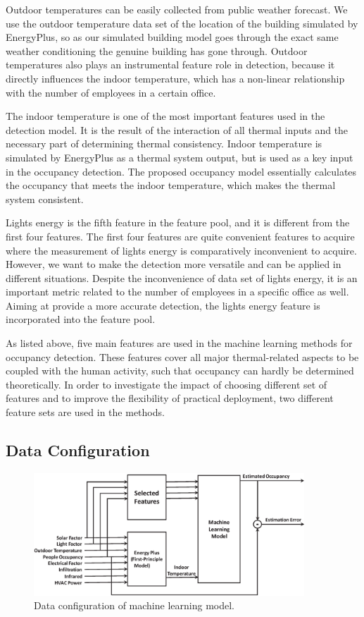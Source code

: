 Outdoor temperatures can be easily collected from public weather forecast. We
use the outdoor temperature data set of the location of the building simulated
by EnergyPlus, so as our simulated building model goes through the exact same
weather conditioning the genuine building has gone through. Outdoor
temperatures also plays an instrumental feature role in detection, because it
directly influences the indoor temperature, which has a non-linear relationship
with the number of employees in a certain office.

The indoor temperature is one of the most important features used in the
detection model. It is the result of the interaction of all thermal inputs and
the necessary part of determining thermal consistency. Indoor temperature is
simulated by EnergyPlus as a thermal system output, but is used as a key input
in the occupancy detection. The proposed occupancy model essentially calculates
the occupancy that meets the indoor temperature, which makes the thermal system
consistent.

Lights energy is the fifth feature in the feature pool, and it is
different from the first four features. The first four features are quite
convenient features to acquire where the measurement of lights energy
is comparatively inconvenient to acquire. However, we want to make the
detection more versatile and can be applied in different situations.
Despite the inconvenience of data set of lights energy, it is an
important metric related to the number of employees in a specific office
as well. Aiming at provide a more accurate detection, the lights
energy feature is incorporated into the feature pool.

\textcolor{feb18rev}{As listed above, five main features are used in the
machine learning methods for occupancy detection.  These features cover all
major thermal-related aspects to be coupled with the human activity, such that
occupancy can hardly be determined theoretically. In order to investigate the
impact of choosing different set of features and to improve the flexibility of
practical deployment, two different feature sets are used in the methods.}

\subsection{Data Configuration}
\begin{figure}[!h]
\centering
\includegraphics[width=4in]{./Pics/FlowDiagram2.eps}
\caption{Data configuration of machine learning model.}
\label{fig:SVRFlow}
\end{figure}

